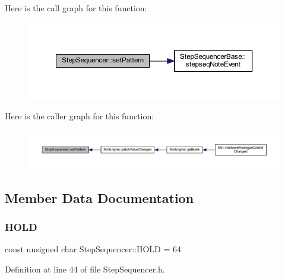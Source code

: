 Here is the call graph for this function\+:
\nopagebreak
\begin{figure}[H]
\begin{center}
\leavevmode
\includegraphics[width=350pt]{dc/d87/class_step_sequencer_ac611afad54d4336977925b7f3495e8b4_cgraph}
\end{center}
\end{figure}
Here is the caller graph for this function\+:
\nopagebreak
\begin{figure}[H]
\begin{center}
\leavevmode
\includegraphics[width=350pt]{dc/d87/class_step_sequencer_ac611afad54d4336977925b7f3495e8b4_icgraph}
\end{center}
\end{figure}


\subsection{Member Data Documentation}
\mbox{\label{class_step_sequencer_ac1b02d103d79f819639067c5ef5e6803}} 
\subsubsection{\texorpdfstring{H\+O\+LD}{HOLD}}
{\footnotesize\ttfamily const unsigned char Step\+Sequencer\+::\+H\+O\+LD = 64\hspace{0.3cm}{\ttfamily [static]}}



Definition at line 44 of file Step\+Sequencer.\+h.

\mbox{\label{class_step_sequencer_a2bba012830137ec08afb83cf5da1d799}} 
